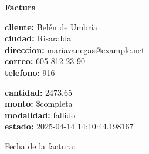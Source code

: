 \documentclass{article}
\begin{document}
\begin{center}
    {\LARGE \textbf{Factura}}\\[1cm]
\end{center}

\textbf{cliente:} Belén de Umbría \\
\textbf{ciudad:} Risaralda \\
\textbf{direccion:} mariavanegas@example.net \\
\textbf{correo:} 605 812 23 90 \\
\textbf{telefono:} 916 \\

\vspace{0.5cm}

\textbf{cantidad:} 2473.65 \\
\textbf{monto:} \$completa \\
\textbf{modalidad:} fallido \\
\textbf{estado:} 2025-04-14 14:10:44.198167 \\

\vspace{1cm}

Fecha de la factura: 
\end{document}
